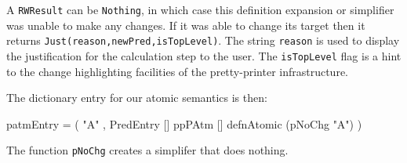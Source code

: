 A \texttt{RWResult} can be \texttt{Nothing},
in which case this definition expansion or simplifier
was unable to make any changes.
If it was able to change its target then it returns
\texttt{Just(reason,newPred,isTopLevel)}.
The string \texttt{reason} is used to display the justification for the
calculation step to the user.
The \texttt{isTopLevel} flag is a hint to the change highlighting facilities
of the pretty-printer infrastructure.


The dictionary entry for our atomic semantics is then:
\begin{code}
patmEntry
 = ( "A"
   , PredEntry [] ppPAtm [] defnAtomic (pNoChg "A") )
\end{code}
The function \texttt{pNoChg} creates a simplifer that does nothing.
